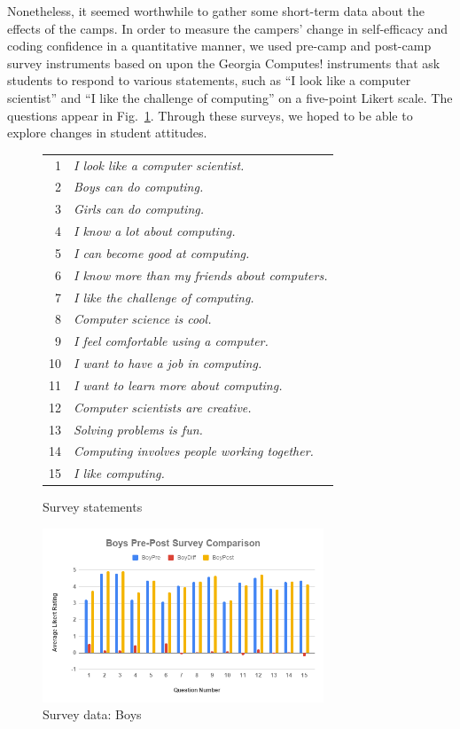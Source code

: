 Nonetheless, it seemed worthwhile to gather some short-term data
about the effects of the camps.  In order to measure the campers'
change in self-efficacy and coding confidence in a quantitative
manner, we used pre-camp and post-camp survey instruments based on
upon the Georgia Computes! instruments \cite{Bruckman2009} that ask
students to respond to various statements, such as ``I look like a
computer scientist'' and ``I like the challenge of computing'' on
a five-point Likert scale.  The questions appear in
Fig.~\ref{figure:survey}.  Through these surveys, we hoped to be
able to explore changes in student attitudes.

\begin{figure}
{\small
\begin{tabular}{rl}
1 & \textit{I look like a computer scientist.} \\
2 & \textit{Boys can do computing.} \\
3 & \textit{Girls can do computing.} \\
4 & \textit{I know a lot about computing.} \\
5 & \textit{I can become good at computing.} \\
6 & \textit{I know more than my friends about computers.} \\
7 & \textit{I like the challenge of computing.} \\
8 & \textit{Computer science is cool.} \\
9 & \textit{I feel comfortable using a computer.} \\
10 & \textit{I want to have a job in computing.} \\
11 & \textit{I want to learn more about computing.} \\
12 & \textit{Computer scientists are creative.} \\
13 & \textit{Solving problems is fun.} \\
14 & \textit{Computing involves people working together.} \\
15 & \textit{I like computing.} 
\end{tabular}
}
\caption{Survey statements}
\label{figure:survey}
\end{figure}

\begin{figure}
\includegraphics[width=3.3in]{images/boys}
\caption{Survey data: Boys}
\label{figure:boys}
\end{figure}

